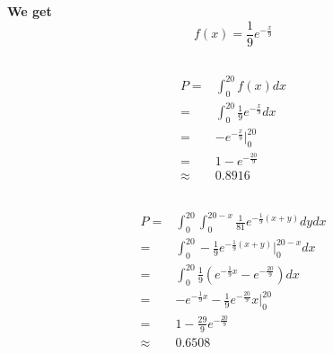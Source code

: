 \documentclass{article}
\begin{document}
    \section{}
        \paragraph{
            We get$$f(x)=\frac{1}{9}e^{-\frac{x}{9}}$$
        }
        \subsection{}
            \paragraph{
                \begin{equation*}
                    \begin{split}
                        P=&\int _0 ^{20} f(x)dx\\
                            =&\int _0 ^{20} \frac{1}{9}e^{-\frac{x}{9}}dx\\
                            =&-e^{-\frac{x}{9}}|_0^{20}\\
                            =&1-e^{-\frac{20}{9}}\\
                            \approx&0.8916
                    \end{split}
                \end{equation*}
            }
        \subsection{}
            \paragraph{
                \begin{equation*}
                    \begin{split}
                        P=&\int_0^{20}\int_{0}^{20-x}\frac{1}{81}e^{-\frac{1}{9}(x+y)}dydx\\
                            =&\int_0^{20}-\frac{1}{9}e^{-\frac{1}{9}(x+y)}|_0^{20-x}dx\\
                            =&\int_0^{20}\frac{1}{9}(e^{-\frac{1}{9}x}-e^{-\frac{20}{9}})dx\\
                            =&-e^{-\frac{1}{9}x}-\frac{1}{9}e^{-\frac{20}{9}}x|_0^{20}\\
                            =&1-\frac{29}{9}e^{-\frac{20}{9}}\\
                            \approx&0.6508
                    \end{split}
                \end{equation*}
            }
                
\end{document}
